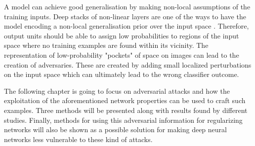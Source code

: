A model can achieve good generalisation by making non-local assumptions of the training inputs. Deep stacks of non-linear layers are one of the ways to have the model encoding a non-local generalisation prior over the input space \cite{gu2014}. Therefore, output units should be able to assign low probabilities to regions of the input space where no training examples are found within its vicinity. The representation of low-probability "pockets" of space on images can lead to the creation of adversaries. These are created by adding small localized perturbations on the input space which can ultimately lead to the wrong classifier outcome. 


The following chapter is going to focus on adversarial attacks and how the exploitation of the aforementioned network properties can be used to craft such examples. Three methods will be presented along with results found by different studies. Finally, methods for using this adversarial information for regularizing networks will also be shown as a possible solution for making deep neural networks less vulnerable to these kind of attacks.

